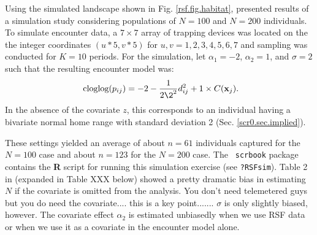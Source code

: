 Using the simulated landscape shown in Fig. \ref{rsf.fig.habitat}, 
\citep{royle_etal:2012mee} presented results of a simulation study
considering populations of $N=100$ and $N=200$ individuals.  To
simulate encounter data, a $7 \times 7$ array of
trapping devices was located on the the integer coordinates $(u*5,v*5)$
for $u,v = 1,2,3,4,5,6,7$ and sampling was conducted for $K=10$ periods.
For the simulation, let $\alpha_{1} = -2$, $\alpha_{2} = 1$, and $\sigma =2$ such
that the resulting encounter model was:
\[
\mbox{ cloglog}(p_{ij}) = -2  -\frac{1}{2\2^{2}} d_{ij}^{2} + 1 \times C({\bf x}_{j}).
\]
In the absence of the covariate $z$, this corresponds
to an individual having a bivariate normal home range with standard
deviation 2 (Sec. \ref{scr0.sec.implied}).


These settings yielded an average of about $n=61$ individuals captured for
the $N=100$ case and about $n=123$ for the $N=200$ case. The \mbox{\tt
  scrbook} package contains the {\bf R} script for running this
simulation exercise (see \mbox{\tt ?RSFsim}). Table 2 in \citep{royle_etal:2012mee} 
(expanded in Table XXX below) showed a pretty dramatic bias in estimating $N$ if the covariate
is omitted from the analysis. You don't need telemetered guys but you
do need the covariate.... this is a key point.......  $\sigma$ is only
slightly biased, however. The covariate effect $\alpha_{2}$ is
estimated unbiasedly when we use RSF data or when we use it as a
covariate in the encounter model alone.

